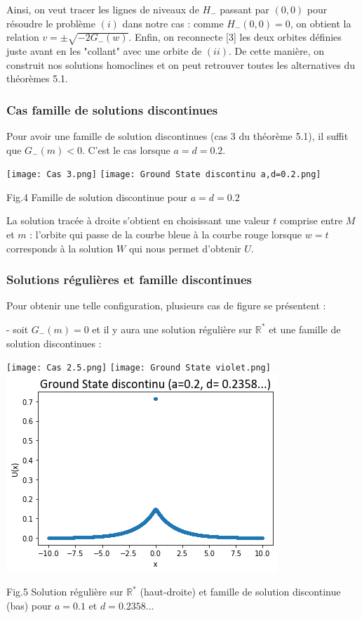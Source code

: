 \documentclass{article}
\begin{document}
Ainsi, on veut tracer les lignes de niveaux de $H_-$ passant par $(0,0)$ pour résoudre le problème $(i)$ dans notre cas : comme $H_-(0,0) = 0$, on obtient la relation $v = \pm \sqrt{-2G_-(w)} $. Enfin, on reconnecte [3] les deux orbites définies juste avant en les "collant" avec une orbite de $(ii)$. De cette manière, on construit nos solutions homoclines et on peut retrouver toutes les alternatives du théorèmes 5.1.

\subsubsection{Cas famille de solutions discontinues}
Pour avoir une famille de solution discontinues (cas 3 du théorème 5.1), il suffit que $G_-(m)<0$. C'est le cas lorsque $a=d=0.2$.

\begin{center}
\texttt{[image: Cas 3.png]}
\texttt{[image: Ground State discontinu a,d=0.2.png]}
 
Fig.4 Famille de solution discontinue pour $a=d=0.2$
\end{center}

La solution tracée à droite s'obtient en choisissant une valeur $t$ comprise entre  $M$ et $m$ : l'orbite qui passe de la courbe bleue à la courbe rouge lorsque $w=t$ corresponds à la solution $W$ qui nous permet d'obtenir $U$.


\subsubsection{Solutions régulières et famille discontinues}
Pour obtenir une telle configuration, plusieurs cas de figure se présentent : 

\noindent - soit  $G_-(m)=0$ et il y aura une solution régulière sur $\mathbb{R}^*$ et une famille de solution discontinues : 

\begin{center}
\texttt{[image: Cas 2.5.png]}
\texttt{[image: Ground State violet.png]}
\includegraphics[scale = 0.45]{Ground State violet discontinu.png}
 
Fig.5 Solution régulière sur $\mathbb{R}^*$ (haut-droite) et famille de solution discontinue (bas) pour $a=0.1$ et $d=0.2358...$
\end{center}
\end{document}
